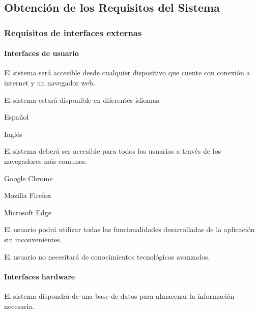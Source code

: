 \subsection{Obtención de los Requisitos del Sistema} 

\subsubsection{Requisitos de interfaces externas}

\paragraph*{Interfaces de usuario}
\begin{myEnumIU}
	\item El sistema será accesible desde cualquier dispositivo que cuente con conexión a internet y un navegador web.
	\item El sistema estará disponible en diferentes idiomas.
	\begin{myEnumIU}
		\item Español
		\item Inglés
	\end{myEnumIU}
	\item El sistema deberá ser accesible para todos los usuarios a través de los navegadores más comunes.
	\begin{myEnumIU}
		\item Google Chrome
		\item Mozilla Firefox
		\item Microsoft Edge
	\end{myEnumIU}
	\item El usuario podrá utilizar todas las funcionalidades desarrolladas de la aplicación sin inconvenientes.
	\item El usuario no necesitará de conocimientos tecnológicos avanzados.
\end{myEnumIU}

\paragraph*{Interfaces hardware}
\begin{myEnumIH}
	\item El sistema dispondrá de una base de datos para almacenar la información necesaria.
\end{myEnumIH}

